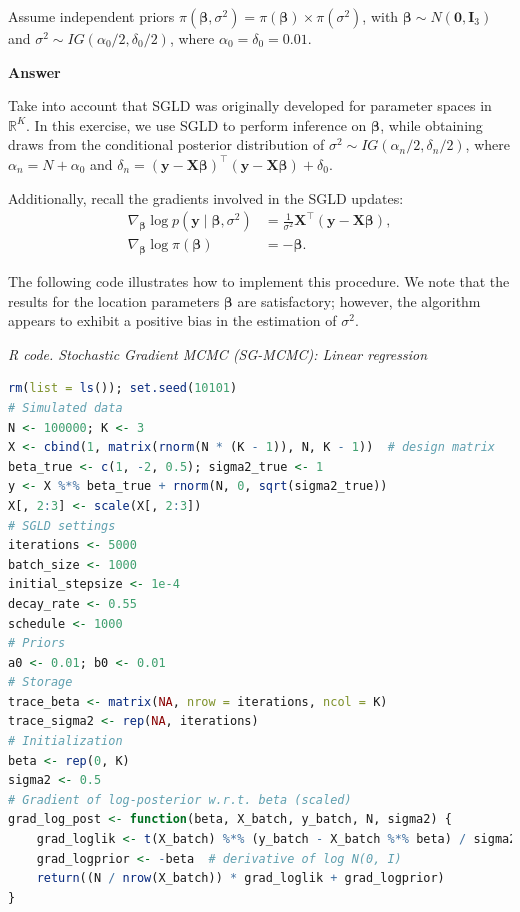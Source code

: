 \begin{enumerate}[leftmargin=*]
Assume independent priors \( \pi(\boldsymbol{\beta}, \sigma^2) = \pi(\boldsymbol{\beta}) \times \pi(\sigma^2) \), with \( \boldsymbol{\beta} \sim {N}(\mathbf{0}, \mathbf{I}_3) \) and \( \sigma^2 \sim {IG}(\alpha_0/2, \delta_0/2) \), where \( \alpha_0 = \delta_0 = 0.01 \).

\textbf{Answer}

Take into account that SGLD was originally developed for parameter spaces in \( \mathbb{R}^K \). In this exercise, we use SGLD to perform inference on \( \boldsymbol{\beta} \), while obtaining draws from the conditional posterior distribution of \( \sigma^2 \sim {IG}(\alpha_n/2, \delta_n/2) \), where \( \alpha_n = N + \alpha_0 \) and \( \delta_n = (\mathbf{y} - \mathbf{X}\boldsymbol{\beta})^{\top}(\mathbf{y} - \mathbf{X}\boldsymbol{\beta}) + \delta_0 \).

Additionally, recall the gradients involved in the SGLD updates:
\begin{align*}
	\nabla_{\boldsymbol{\beta}} \log p(\mathbf{y} \mid \boldsymbol{\beta}, \sigma^2) &= \frac{1}{\sigma^2} \mathbf{X}^{\top}(\mathbf{y} - \mathbf{X}\boldsymbol{\beta}), \\
	\nabla_{\boldsymbol{\beta}} \log \pi(\boldsymbol{\beta}) &= -\boldsymbol{\beta}.
\end{align*}

The following code illustrates how to implement this procedure. We note that the results for the location parameters \( \boldsymbol{\beta} \) are satisfactory; however, the algorithm appears to exhibit a positive bias in the estimation of \( \sigma^2 \).

\begin{tcolorbox}[enhanced,width=4.67in,center upper,
	fontupper=\large\bfseries,drop shadow southwest,sharp corners]
	\textit{R code. Stochastic Gradient MCMC (SG-MCMC): Linear regression}
	\begin{VF}
		\begin{lstlisting}[language=R]
rm(list = ls()); set.seed(10101)
# Simulated data
N <- 100000; K <- 3
X <- cbind(1, matrix(rnorm(N * (K - 1)), N, K - 1))  # design matrix
beta_true <- c(1, -2, 0.5); sigma2_true <- 1
y <- X %*% beta_true + rnorm(N, 0, sqrt(sigma2_true))
X[, 2:3] <- scale(X[, 2:3])
# SGLD settings
iterations <- 5000
batch_size <- 1000
initial_stepsize <- 1e-4
decay_rate <- 0.55
schedule <- 1000
# Priors
a0 <- 0.01; b0 <- 0.01
# Storage
trace_beta <- matrix(NA, nrow = iterations, ncol = K)
trace_sigma2 <- rep(NA, iterations)
# Initialization
beta <- rep(0, K)
sigma2 <- 0.5
# Gradient of log-posterior w.r.t. beta (scaled)
grad_log_post <- function(beta, X_batch, y_batch, N, sigma2) {
	grad_loglik <- t(X_batch) %*% (y_batch - X_batch %*% beta) / sigma2
	grad_logprior <- -beta  # derivative of log N(0, I)
	return((N / nrow(X_batch)) * grad_loglik + grad_logprior)
}
\end{lstlisting}
	\end{VF}
\end{tcolorbox}


\end{enumerate}
